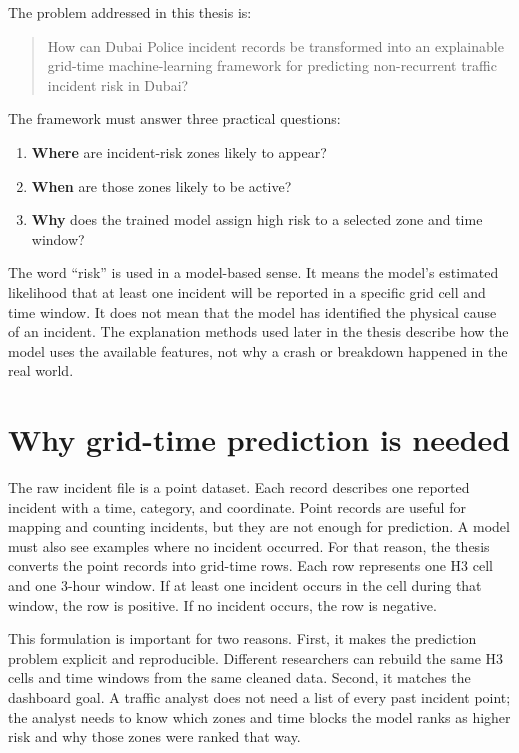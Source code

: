 The problem addressed in this thesis is:

\begin{quote}
How can Dubai Police incident records be transformed into an explainable grid-time machine-learning framework for predicting non-recurrent traffic incident risk in Dubai?
\end{quote}

The framework must answer three practical questions:

\begin{enumerate}
    \item \textbf{Where} are incident-risk zones likely to appear?
    \item \textbf{When} are those zones likely to be active?
    \item \textbf{Why} does the trained model assign high risk to a selected zone and time window?
\end{enumerate}

The word ``risk'' is used in a model-based sense. It means the model's estimated likelihood that at least one incident will be reported in a specific grid cell and time window. It does not mean that the model has identified the physical cause of an incident. The explanation methods used later in the thesis describe how the model uses the available features, not why a crash or breakdown happened in the real world.

\section{Why grid-time prediction is needed}

The raw incident file is a point dataset. Each record describes one reported incident with a time, category, and coordinate. Point records are useful for mapping and counting incidents, but they are not enough for prediction. A model must also see examples where no incident occurred. For that reason, the thesis converts the point records into grid-time rows. Each row represents one H3 cell and one 3-hour window. If at least one incident occurs in the cell during that window, the row is positive. If no incident occurs, the row is negative.

This formulation is important for two reasons. First, it makes the prediction problem explicit and reproducible. Different researchers can rebuild the same H3 cells and time windows from the same cleaned data. Second, it matches the dashboard goal. A traffic analyst does not need a list of every past incident point; the analyst needs to know which zones and time blocks the model ranks as higher risk and why those zones were ranked that way.

